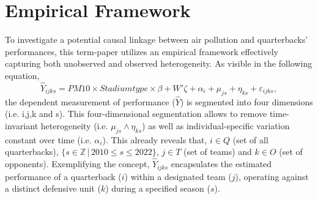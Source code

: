 \documentclass[12pt,a4paper]{article}
\begin{document}
\section{Empirical Framework}
To investigate a potential causal linkage between air pollution and quarterbacks' performances, this term-paper utilizes an empirical framework effectively capturing both unobserved and observed heterogeneity. As visible in the following equation,
\begin{equation}
\hat{Y}_{ijks} = PM10 \times Stadiumtype \times \beta + {W'} \zeta + \alpha_i + \mu_{js} + \eta_{ks} + \varepsilon_{ijks},
\end{equation}
the dependent measurement of performance ($\hat{Y}$) is segmented into four dimensions (i.e. i,j,k and s). This four-dimensional segmentation allows to remove time-invariant heterogeneity (i.e. $ \mu_{js} \wedge \eta_{ks}$) as well as individual-specific variation constant over time (i.e. $\alpha_i$). This already reveals that, $i \in Q$ (set of all quarterbacks), $\{s \in \mathbb{Z} \, | \, 2010 \leq s \leq 2022\}$, $j \in T$ (set of teams) and $k \in O$ (set of opponents). Exemplifying the concept, $\hat{Y}_{ijks}$ encapsulates the estimated performance of a quarterback ($i$) within a designated team ($j$), operating against a distinct defensive unit ($k$) during a specified season ($s$). 
\end{document}
